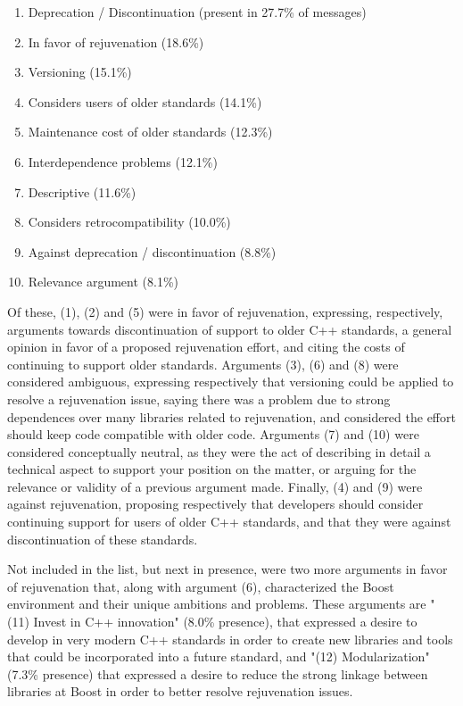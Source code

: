 \begin{enumerate}
    \item Deprecation / Discontinuation (present in 27.7\% of messages)
    \item In favor of rejuvenation (18.6\%)
    \item Versioning (15.1\%)
    \item Considers users of older standards (14.1\%)
    \item Maintenance cost of older standards (12.3\%)
    \item Interdependence problems (12.1\%)
    \item Descriptive (11.6\%)
    \item Considers retrocompatibility (10.0\%)
    \item Against deprecation / discontinuation (8.8\%)
    \item Relevance argument (8.1\%)
\end{enumerate}

Of these, (1), (2) and (5) were in favor of rejuvenation, expressing, respectively, arguments towards discontinuation of support to older C++ standards, a general opinion in favor of a proposed rejuvenation effort, and citing the costs of continuing to support older standards. Arguments (3), (6) and (8) were considered ambiguous, expressing respectively that versioning could be applied to resolve a rejuvenation issue, saying there was a problem due to strong dependences over many libraries related to rejuvenation, and considered the effort should keep code compatible with older code. Arguments (7) and (10) were considered conceptually neutral, as they were the act of describing in detail a technical aspect to support your position on the matter, or arguing for the relevance or validity of a previous argument made. Finally, (4) and (9) were against rejuvenation, proposing respectively that developers should consider continuing support for users of older C++ standards, and that they were against discontinuation of these standards.

Not included in the list, but next in presence, were two more arguments in favor of rejuvenation that, along with argument (6), characterized the Boost environment and their unique ambitions and problems. These arguments are "(11) Invest in C++ innovation" (8.0\% presence), that expressed a desire to develop in very modern C++ standards in order to create new libraries and tools that could be incorporated into a future standard, and "(12) Modularization" (7.3\% presence) that expressed a desire to reduce the strong linkage between libraries at Boost in order to better resolve rejuvenation issues.

